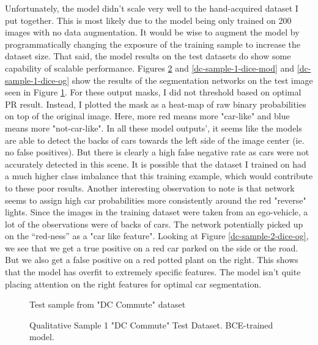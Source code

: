\documentclass[Location Location Location! : Exploring Image Segmentation Problem In Urban Driving Scenarios]{IEEEtran}
\begin{document}
Unfortunately, the model didn't scale very well to the hand-acquired dataset I put together. This is most likely due to the model being only trained on 200 images with no data augmentation. It would be wise to augment the model by programmatically changing the exposure of the training sample to increase the dataset size. That said, the model results on the test datasets do show some capability of scalable performance. Figures \ref{dc-sample-1-bce} and \ref{dc-sample-1-dice-mod} and \ref{dc-sample-1-dice-og} show the results of the segmentation networks on the test image seen in Figure \ref{dc-sample-1-input}. For these output masks, I did not threshold based on optimal PR result. Instead, I plotted the mask as a heat-map of raw binary probabilities on top of the original image. Here, more red means more "car-like" and blue means more "not-car-like". In all these model outputs', it seems like the models are able to detect the backs of cars towards the left side of the image center (ie. no false positives). But there is clearly a high false negative rate as cars were not accurately detected in this scene. It is possible that the dataset I trained on had a much higher class imbalance that this training example, which would contribute to these poor results.  Another interesting observation to note is that network seems to assign high car probabilities more consistently around the red "reverse" lights. Since the images in the training dataset were taken from an ego-vehicle, a lot of the observations were of backs of cars. The network potentially picked up on the “red-ness” as a "car like feature". Looking at Figure \ref{dc-sample-2-dice-og}, we see that we get a true positive on a red car parked on the side or the road. But we also get a false positive on a red potted plant on the right. This shows that the model has overfit to extremely specific features. The model isn't quite placing attention on the right features for optimal car segmentation.  

\begin{figure}[htbp]
\caption{Test sample from "DC Commute" dataset}
\label{dc-sample-1-input}
\end{figure}


\begin{figure}[htbp]
\caption{Qualitative Sample 1 "DC Commute" Test Dataset. BCE-trained model. }
\label{dc-sample-1-bce}
\end{figure}
\end{document}
